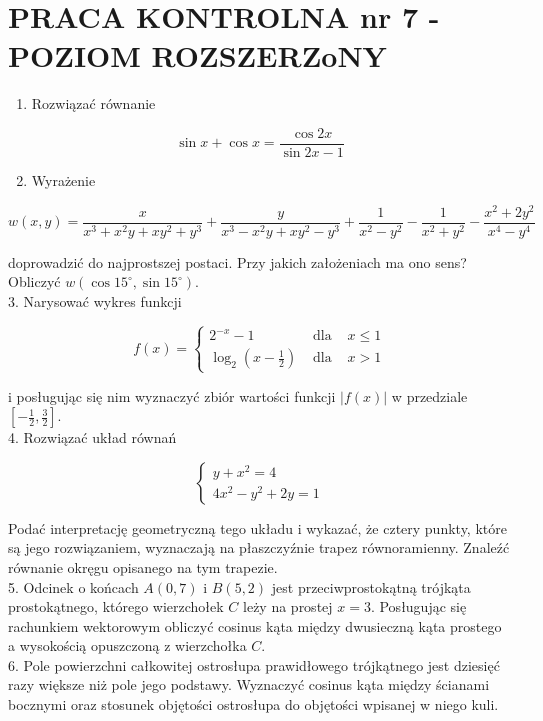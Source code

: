 \documentclass[10pt]{article}
\begin{document}
\section*{PRACA KONTROLNA nr 7 - POZIOM ROZSZERZoNY}
\begin{enumerate}
  \item Rozwiązać równanie
\end{enumerate}

$$
\sin x+\cos x=\frac{\cos 2 x}{\sin 2 x-1}
$$

\begin{enumerate}
  \setcounter{enumi}{1}
  \item Wyrażenie
\end{enumerate}

$$
w(x, y)=\frac{x}{x^{3}+x^{2} y+x y^{2}+y^{3}}+\frac{y}{x^{3}-x^{2} y+x y^{2}-y^{3}}+\frac{1}{x^{2}-y^{2}}-\frac{1}{x^{2}+y^{2}}-\frac{x^{2}+2 y^{2}}{x^{4}-y^{4}}
$$

doprowadzić do najprostszej postaci. Przy jakich założeniach ma ono sens? Obliczyć $w\left(\cos 15^{\circ}, \sin 15^{\circ}\right)$.\\
3. Narysować wykres funkcji

$$
f(x)=\left\{\begin{array}{lll}
2^{-x}-1 & \text { dla } & x \leqslant 1 \\
\log _{2}\left(x-\frac{1}{2}\right) & \text { dla } & x>1
\end{array}\right.
$$

i posługując się nim wyznaczyć zbiór wartości funkcji $|f(x)|$ w przedziale $\left[-\frac{1}{2}, \frac{3}{2}\right]$.\\
4. Rozwiązać układ równań

$$
\left\{\begin{array}{l}
y+x^{2}=4 \\
4 x^{2}-y^{2}+2 y=1
\end{array}\right.
$$

Podać interpretację geometryczną tego układu i wykazać, że cztery punkty, które są jego rozwiązaniem, wyznaczają na płaszczyźnie trapez równoramienny. Znaleźć równanie okręgu opisanego na tym trapezie.\\
5. Odcinek o końcach $A(0,7)$ i $B(5,2)$ jest przeciwprostokątną trójkąta prostokątnego, którego wierzchołek $C$ leży na prostej $x=3$. Posługując się rachunkiem wektorowym obliczyć cosinus kąta między dwusieczną kąta prostego a wysokością opuszczoną z wierzchołka $C$.\\
6. Pole powierzchni całkowitej ostrosłupa prawidłowego trójkątnego jest dziesięć razy większe niż pole jego podstawy. Wyznaczyć cosinus kąta między ścianami bocznymi oraz stosunek objętości ostrosłupa do objętości wpisanej w niego kuli.
\end{document}
